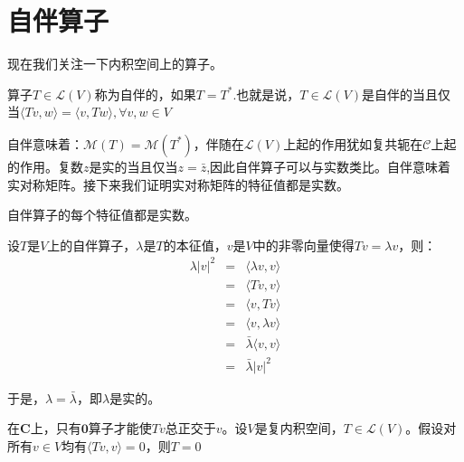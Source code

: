 \documentclass[10pt,a4paper,UTF8]{article}
\begin{document}
\section{自伴算子}
\label{sec:org3a59b79}


现在我们关注一下内积空间上的算子。
\begin{definition}
算子\(T\in \mathcal{L}(V)\)称为自伴的，如果\(T= T^{*}\).也就是说，\(T\in \mathcal{L}(V)\)是自伴的当且仅当\(\langle Tv,w \rangle = \langle v,Tw \rangle  ,\forall v,w\in V\)
\end{definition}
自伴意味着：\(\mathcal{M}(T) = \mathcal{M}(T^{*})\)，伴随在\(\mathcal{L}(V)\)上起的作用犹如复共轭在\(\mathcal{C}\)上起的作用。复数\(z\)是实的当且仅当\(z=\bar{z}\),因此自伴算子可以与实数类比。自伴意味着实对称矩阵。接下来我们证明实对称矩阵的特征值都是实数。

\begin{tikztheorem}
自伴算子的每个特征值都是实数。
\end{tikztheorem}
\begin{tikzproof}
设\(T\)是\(V\)上的自伴算子，\(\lambda\)是\(T\)的本征值，\(v\)是\(V\)中的非零向量使得\(Tv= \lambda v\)，则：
\begin{eqnarray}
\label{eq:15}
\lambda \lvert v \rvert^{2} &=& \langle \lambda v,v \rangle \\
&=& \langle Tv,v \rangle \\
&=& \langle v,Tv \rangle \\
&=& \langle v,\lambda v \rangle  \\
&=& \bar{\lambda} \langle v,v \rangle \\
&=& \bar{\lambda} \lvert v \rvert^{2}
\end{eqnarray}



于是，\(\lambda = \bar{\lambda}\)，即\(\lambda\)是实的。
\end{tikzproof}

\begin{tikztheorem}
在\(\mathbf{C}\)上，只有\(\mathbf{0}\)算子才能使\(Tv\)总正交于\(v\)。设\(V\)是复内积空间，\(T\in \mathcal{L}(V)\)。假设对所有\(v\in V\)均有\(\langle Tv,v \rangle = 0\)，则\(T=0\)
\end{tikztheorem}
\end{document}
